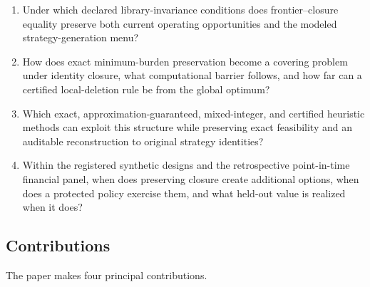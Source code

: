 \begin{enumerate}
\item[\textbf{RQ1.}] Under which declared library-invariance conditions does
frontier--closure equality preserve both current operating opportunities and
the modeled strategy-generation menu?

\item[\textbf{RQ2.}] How does exact minimum-burden preservation become a
covering problem under identity closure, what computational barrier follows,
and how far can a certified local-deletion rule be from the global optimum?

\item[\textbf{RQ3.}] Which exact, approximation-guaranteed, mixed-integer, and
certified heuristic methods can exploit this structure while preserving exact
feasibility and an auditable reconstruction to original strategy identities?

\item[\textbf{RQ4.}] Within the registered synthetic designs and the
retrospective point-in-time financial panel, when does preserving closure
create additional options, when does a protected policy exercise them, and
what held-out value is realized when it does?
\end{enumerate}

\subsection{Contributions}

The paper makes four principal contributions.

